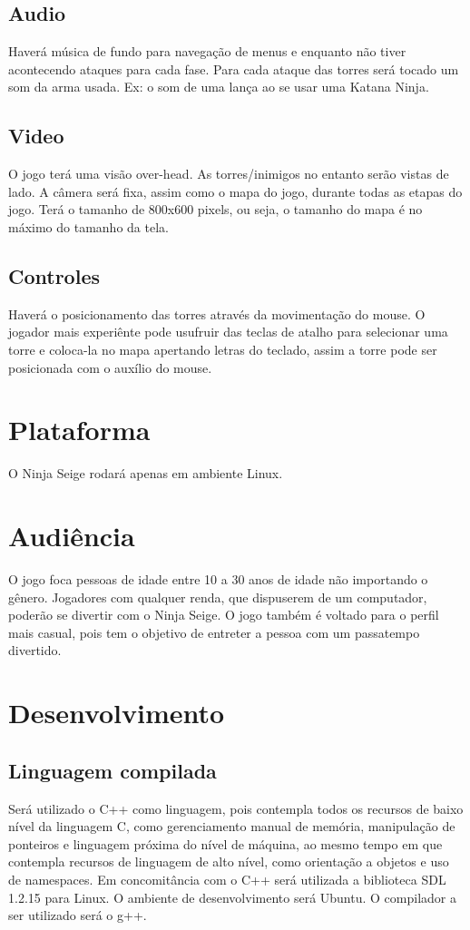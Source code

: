 \documentclass[10pt,a4paper]{article}
\begin{document}
\subsection{Audio}
Haverá música de fundo para navegação de menus e enquanto não tiver acontecendo ataques
para cada fase. Para cada ataque das torres será tocado um som da arma usada. Ex: o som de uma lança
ao se usar uma Katana Ninja.
\subsection{Video}
O jogo terá uma visão over-head. As torres/inimigos no entanto serão vistas de lado. A câmera
será fixa, assim como o mapa do jogo, durante todas as etapas do jogo. Terá o tamanho de 800x600
pixels, ou seja, o tamanho do mapa é no máximo do tamanho da tela.
\subsection{Controles}
Haverá o posicionamento das torres através da movimentação do mouse. O jogador mais
experiênte pode usufruir das teclas de atalho para selecionar uma torre e coloca-la no mapa apertando
letras do teclado, assim a torre pode ser posicionada com o auxílio do mouse.

\section{Plataforma}
	O Ninja Seige rodará apenas em ambiente Linux.

\section{Audiência}
	O jogo foca pessoas de idade entre 10 a 30 anos de idade não importando o gênero. Jogadores
com qualquer renda, que dispuserem de um computador, poderão se divertir com o Ninja Seige. O jogo
também é voltado para o perfil mais casual, pois tem o objetivo de entreter a pessoa com um
passatempo divertido.

\section{Desenvolvimento}
\subsection{Linguagem compilada}
	Será utilizado o C++ como linguagem, pois contempla todos os recursos de baixo nível da
linguagem C, como gerenciamento manual de memória, manipulação de ponteiros e linguagem próxima
do nível de máquina, ao mesmo tempo em que contempla recursos de linguagem de alto nível, como
orientação a objetos e uso de namespaces. Em concomitância com o C++ será utilizada a biblioteca SDL
1.2.15 para Linux. O ambiente de desenvolvimento será Ubuntu. O compilador a ser utilizado será o g++.
\end{document}
